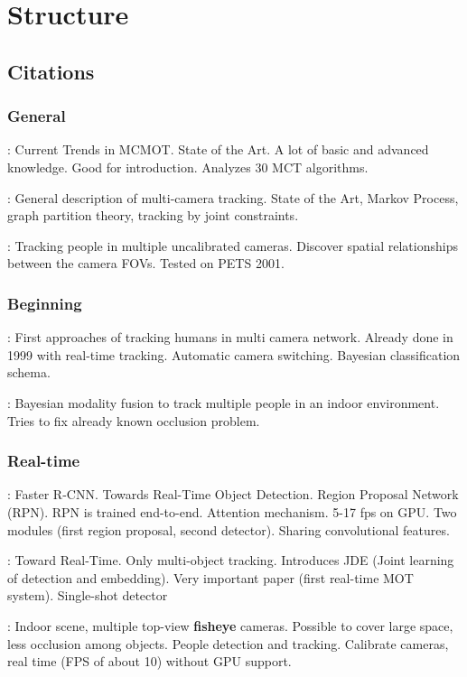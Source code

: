 \chapter{Structure}

\section{Citations}

\subsection{General}

\cite{Amosa23}: Current Trends in MCMOT. State of the Art. A lot of basic and advanced knowledge. Good for introduction. Analyzes 30 MCT algorithms.

\cite{Tian19}: General description of multi-camera tracking. State of the Art, Markov Process, graph partition theory, tracking by joint constraints.

\cite{Khan01}: Tracking people in multiple uncalibrated cameras. Discover spatial relationships between the camera FOVs. Tested on PETS 2001.

\subsection{Beginning}

\cite{Cai99}: First approaches of tracking humans in multi camera network. Already done in 1999 with real-time tracking. Automatic camera switching. Bayesian classification schema.

\cite{Chang01}: Bayesian modality fusion to track multiple people in an indoor environment. Tries to fix already known occlusion problem.

\subsection{Real-time}

\cite{Ren17}: Faster R-CNN. Towards Real-Time Object Detection. Region Proposal Network (RPN). RPN is trained end-to-end. Attention mechanism. 5-17 fps on GPU. Two modules (first region proposal, second detector). Sharing convolutional features.

\cite{Wang20a}: Toward Real-Time. Only multi-object tracking. Introduces JDE (Joint learning of detection and embedding). Very important paper (first real-time MOT system). Single-shot detector

\cite{Wang21}: Indoor scene, multiple top-view \textbf{fisheye} cameras. Possible to cover large space, less occlusion among objects. People detection and tracking. Calibrate cameras, real time (FPS of about 10) without GPU support.

